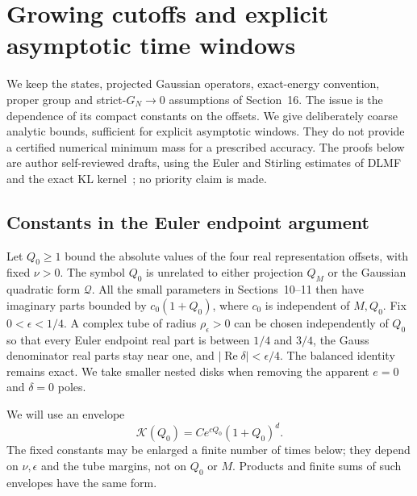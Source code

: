 \section{Growing cutoffs and explicit asymptotic time windows}
\label{sec:growingbox}
We keep the states, projected Gaussian operators, exact-energy convention,
proper group and strict-$G_N\to0$ assumptions of Section~16. The issue is
the dependence of its compact constants on the offsets. We give deliberately
coarse analytic bounds, sufficient for explicit asymptotic windows. They
do not provide a certified numerical minimum mass for a prescribed accuracy.
The proofs below are author self-reviewed drafts, using the Euler and
Stirling estimates of DLMF~\cite[5.11, 15.6, 15.8, 2.3]{DLMF} and the
exact KL kernel~\cite{KL}; no priority claim is made.

\subsection{Constants in the Euler endpoint argument}
Let $Q_0\ge1$ bound the absolute values of the four real representation
offsets, with fixed $\nu>0$. The symbol $Q_0$ is unrelated to either
projection $Q_M$ or the Gaussian quadratic form $\mathcal Q$.
All the small parameters in Sections~10--11 then have imaginary parts
bounded by $c_0(1+Q_0)$, where $c_0$ is independent of $M,Q_0$.
Fix $0<\epsilon<1/4$. A complex tube of radius $\rho_\epsilon>0$
can be chosen independently of $Q_0$ so that every Euler endpoint real
part is between $1/4$ and $3/4$, the Gauss denominator real parts stay
near one, and $|\operatorname{Re}\delta|<\epsilon/4$.
The balanced identity remains exact. We take smaller nested disks when
removing the apparent $e=0$ and $\delta=0$ poles.

We will use an envelope
\begin{equation}
 \mathcal K(Q_0)=C e^{c Q_0}(1+Q_0)^d.
 \label{eq:gb-envelope}
\end{equation}
The fixed constants may be enlarged a finite number of times below;
they depend on $\nu,\epsilon$ and the tube margins, not on $Q_0$ or $M$.
Products and finite sums of such envelopes have the same form.

